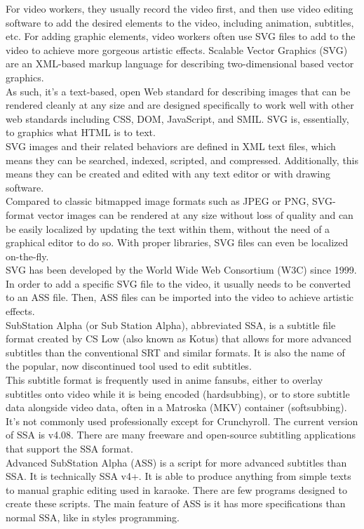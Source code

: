 \documentclass[10pt,twocolumn,letterpaper]{article}
\numberwithin{figure}{section}
\begin{document}
For video workers, they usually record the video first, and then use video editing software to add the desired elements to the video, including animation, subtitles, etc. For adding graphic elements, video workers often use SVG files to add to the video to achieve more gorgeous artistic effects.
Scalable Vector Graphics (SVG) are an XML-based markup language for describing two-dimensional based vector graphics. \\
As such, it's a text-based, open Web standard for describing images that can be rendered cleanly at any size and are designed specifically to work well with other web standards including CSS, DOM, JavaScript, and SMIL. SVG is, essentially, to graphics what HTML is to text. \\
SVG images and their related behaviors are defined in XML text files, which means they can be searched, indexed, scripted, and compressed. Additionally, this means they can be created and edited with any text editor or with drawing software. \\
Compared to classic bitmapped image formats such as JPEG or PNG, SVG-format vector images can be rendered at any size without loss of quality and can be easily localized by updating the text within them, without the need of a graphical editor to do so. With proper libraries, SVG files can even be localized on-the-fly. \\
SVG has been developed by the World Wide Web Consortium (W3C) since 1999. In order to add a specific SVG file to the video, it usually needs to be converted to an ASS file. Then, ASS files can be imported into the video to achieve artistic effects. \\
SubStation Alpha (or Sub Station Alpha), abbreviated SSA, is a subtitle file format created by CS Low (also known as Kotus) that allows for more advanced subtitles than the conventional SRT and similar formats. It is also the name of the popular, now discontinued tool used to edit subtitles. \\
This subtitle format is frequently used in anime fansubs, either to overlay subtitles onto video while it is being encoded (hardsubbing), or to store subtitle data alongside video data, often in a Matroska (MKV) container (softsubbing). It's not commonly used professionally except for Crunchyroll.
The current version of SSA is v4.08. There are many freeware and open-source subtitling applications that support the SSA format. \\
Advanced SubStation Alpha (ASS) is a script for more advanced subtitles than SSA. It is technically SSA v4+. It is able to produce anything from simple texts to manual graphic editing used in karaoke. There are few programs designed to create these scripts. The main feature of ASS is it has more specifications than normal SSA, like in styles programming. \\
\end{document}
